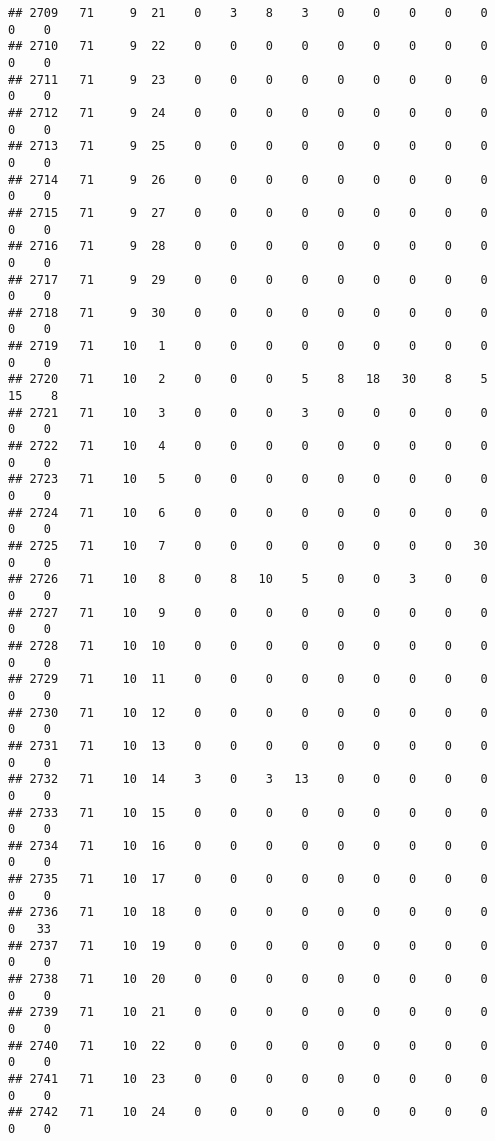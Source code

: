 \documentclass[]{article}
\begin{document}
\begin{verbatim}
## 2709   71     9  21    0    3    8    3    0    0    0    0    0    0    0
## 2710   71     9  22    0    0    0    0    0    0    0    0    0    0    0
## 2711   71     9  23    0    0    0    0    0    0    0    0    0    0    0
## 2712   71     9  24    0    0    0    0    0    0    0    0    0    0    0
## 2713   71     9  25    0    0    0    0    0    0    0    0    0    0    0
## 2714   71     9  26    0    0    0    0    0    0    0    0    0    0    0
## 2715   71     9  27    0    0    0    0    0    0    0    0    0    0    0
## 2716   71     9  28    0    0    0    0    0    0    0    0    0    0    0
## 2717   71     9  29    0    0    0    0    0    0    0    0    0    0    0
## 2718   71     9  30    0    0    0    0    0    0    0    0    0    0    0
## 2719   71    10   1    0    0    0    0    0    0    0    0    0    0    0
## 2720   71    10   2    0    0    0    5    8   18   30    8    5   15    8
## 2721   71    10   3    0    0    0    3    0    0    0    0    0    0    0
## 2722   71    10   4    0    0    0    0    0    0    0    0    0    0    0
## 2723   71    10   5    0    0    0    0    0    0    0    0    0    0    0
## 2724   71    10   6    0    0    0    0    0    0    0    0    0    0    0
## 2725   71    10   7    0    0    0    0    0    0    0    0   30    0    0
## 2726   71    10   8    0    8   10    5    0    0    3    0    0    0    0
## 2727   71    10   9    0    0    0    0    0    0    0    0    0    0    0
## 2728   71    10  10    0    0    0    0    0    0    0    0    0    0    0
## 2729   71    10  11    0    0    0    0    0    0    0    0    0    0    0
## 2730   71    10  12    0    0    0    0    0    0    0    0    0    0    0
## 2731   71    10  13    0    0    0    0    0    0    0    0    0    0    0
## 2732   71    10  14    3    0    3   13    0    0    0    0    0    0    0
## 2733   71    10  15    0    0    0    0    0    0    0    0    0    0    0
## 2734   71    10  16    0    0    0    0    0    0    0    0    0    0    0
## 2735   71    10  17    0    0    0    0    0    0    0    0    0    0    0
## 2736   71    10  18    0    0    0    0    0    0    0    0    0    0   33
## 2737   71    10  19    0    0    0    0    0    0    0    0    0    0    0
## 2738   71    10  20    0    0    0    0    0    0    0    0    0    0    0
## 2739   71    10  21    0    0    0    0    0    0    0    0    0    0    0
## 2740   71    10  22    0    0    0    0    0    0    0    0    0    0    0
## 2741   71    10  23    0    0    0    0    0    0    0    0    0    0    0
## 2742   71    10  24    0    0    0    0    0    0    0    0    0    0    0

\end{verbatim}
\end{document}
